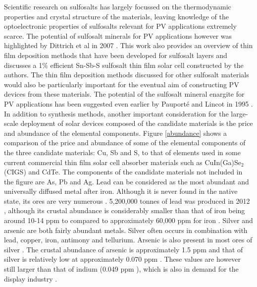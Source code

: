 Scientific research on sulfosalts has largely focussed on the thermodynamic properties and crystal structure of the materials, leaving knowledge of the optoelectronic properties of sulfosalts relevant for PV applications extremely scarce. 
The potential of sulfosalt minerals for PV applications however was highlighted by Dittrich et al in 2007 \cite{Dittrich2}. This work also provides an overview of thin film deposition methods that have been developed for sulfosalt layers and discusses a 1\% efficient Sn-Sb-S sulfosalt thin film solar cell constructed by the authors. The thin film deposition methods discussed for other sulfosalt materials would also be particularly important for the eventual aim of constructing PV devices from these materials. The potential of the sulfosalt mineral enargite for PV applications has been suggested even earlier by Pauport\'{e} and Lincot in 1995 \cite{enargite_properties}. In addition to synthesis methods, another important consideration for the large-scale deployment of solar devices composed of the candidate materials is the price and abundance of the elemental components. Figure \ref{abundance} shows a comparison of the price and abundance of some of the elemental components of the three candidate materials: Cu, Sb and S, to that of elements used in some current commercial thin film solar cell absorber materials such as CuIn(Ga)Se$_{2}$ (CIGS) and CdTe. The components of the candidate materials not included in the figure are As, Pb and Ag. Lead can be considered as the most abundant and universally diffused metal after iron. Although it is never found in the native state, its ores are very numerous \cite{abundance}. 5,200,000 tonnes of lead was produced in 2012 \cite{ab_prod}, although its crustal abundance is considerably smaller than that of iron being around 10-14 ppm to compared to approximately 60,000 ppm for iron \cite{ab_1}. 
Silver and arsenic are both fairly abundant metals. Silver often occurs in combination with lead, copper, iron, antimony and tellurium. Arsenic is also present in most ores of silver \cite{abundance}. The crustal abundance of arsenic is approximately 1.5 ppm and that of silver is relatively low at approximately 0.070 ppm \cite{ab_1}. These values are however still larger than that of indium (0.049 ppm \cite{ab_1}), which is also in demand for the display industry \cite{SS}.\\


